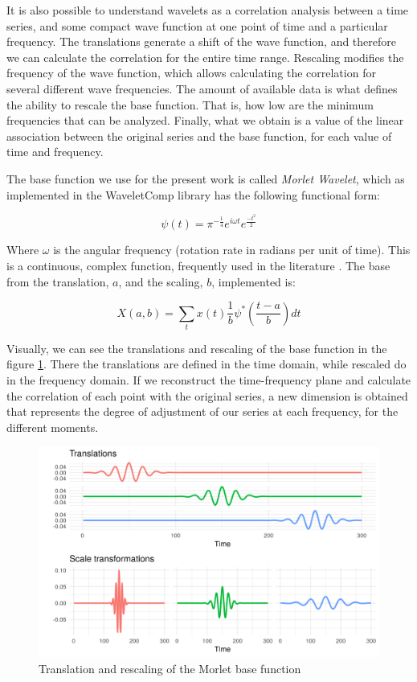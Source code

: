 \documentclass[a4paper,10cpi]{article}
\begin{document}
	It is also possible to understand wavelets as a correlation analysis between a time series, and some compact wave function at one point of time and a particular frequency. The translations generate a shift of the wave function, and therefore we can calculate the correlation for the entire time range. Rescaling modifies the frequency of the wave function, which allows calculating the correlation for several different wave frequencies. The amount of available data is what defines the ability to rescale the base function. That is, how low are the minimum frequencies that can be analyzed. Finally, what we obtain is a value of the linear association between the original series and the base function, for each value of time and frequency.
	
	The base function we use for the present work is called \textit{Morlet Wavelet}, which as implemented in the WaveletComp \citep{Roesch2018} library has the following functional form:
	
	$$
	\psi(t)=\pi^{-\frac{1}{4}}e^{i\omega t}e^{\frac{-t^2}{2}}
	$$
	
	
	Where $\omega$ is the angular frequency (rotation rate in radians per unit of time). This is a continuous, complex function, frequently used in the literature \citep{conraria2011continuous}. The base from the translation, $a$, and the scaling, $b$, implemented is:
	
	$$
	X(a,b)=\sum_{t} x(t)   \frac{1}{b} \psi^*\left(\frac{t-a}{b}\right)dt
	$$
	
	Visually, we can see the translations and rescaling of the base function in the figure \ref{fig:morlet}. There the translations are defined in the time domain, while rescaled do in the frequency domain. If we reconstruct the time-frequency plane and calculate the correlation of each point with the original series, a new dimension is obtained that represents the degree of adjustment of our series at each frequency, for the different moments.
	
	\begin{figure}[H]
		\centering
		\includegraphics[width=\linewidth]{morelt_en.png}
		\caption{Translation and rescaling of the Morlet base function} \label{fig:morlet}
	\end{figure}
	
\end{document}
